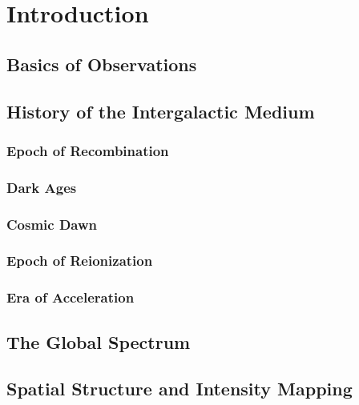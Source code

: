 \chapter{Introduction}

\section{Basics of \cm Observations}

\section{History of the Intergalactic Medium}

\subsection{Epoch of Recombination}

\subsection{Dark Ages}

\subsection{Cosmic Dawn}

\subsection{Epoch of Reionization}

\subsection{Era of Acceleration}

\section{The \cm Global Spectrum}

\section{\cm Spatial Structure and Intensity Mapping}

